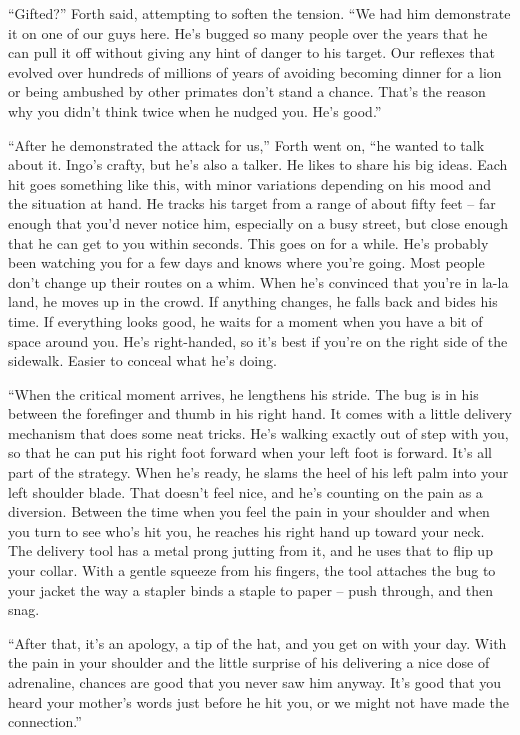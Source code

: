\documentclass[12pt]{book}
\begin{document}
``Gifted?'' Forth said, attempting to soften the tension.  ``We had him demonstrate it on one of our guys here.  He's bugged so many people over the years that he can pull it off without giving any hint of danger to his target.  Our reflexes that evolved over hundreds of millions of years of avoiding becoming dinner for a lion or being ambushed by other primates don't stand a chance.  That's the reason why you didn't think twice when he nudged you.  He's good.''

``After he demonstrated the attack for us,'' Forth went on, ``he wanted to talk about it.  Ingo's crafty, but he's also a talker.  He likes to share his big ideas.  Each hit goes something like this, with minor variations depending on his mood and the situation at hand.  He tracks his target from a range of about fifty feet -- far enough that you'd never notice him, especially on a busy street, but close enough that he can get to you within seconds.  This goes on for a while.  He's probably been watching you for a few days and knows where you're going.  Most people don't change up their routes on a whim.  When he's convinced that you're in la-la land, he moves up in the crowd.  If anything changes, he falls back and bides his time.  If everything looks good, he waits for a moment when you have a bit of space around you.  He's right-handed, so it's best if you're on the right side of the sidewalk.  Easier to conceal what he's doing.

``When the critical moment arrives, he lengthens his stride.  The bug is in his between the forefinger and thumb in his right hand.  It comes with a little delivery mechanism that does some neat tricks.  He's walking exactly out of step with you, so that he can put his right foot forward when your left foot is forward.  It's all part of the strategy.  When he's ready, he slams the heel of his left palm into your left shoulder blade.  That doesn't feel nice, and he's counting on the pain as a diversion.  Between the time when you feel the pain in your shoulder and when you turn to see who's hit you, he reaches his right hand up toward your neck.  The delivery tool has a metal prong jutting from it, and he uses that to flip up your collar.  With a gentle squeeze from his fingers, the tool attaches the bug to your jacket the way a stapler binds a staple to paper -- push through, and then snag.

``After that, it's an apology, a tip of the hat, and you get on with your day.  With the pain in your shoulder and the little surprise of his delivering a nice dose of adrenaline, chances are good that you never saw him anyway.  It's good that you heard your mother's words just before he hit you, or we might not have made the connection.''
\end{document}
